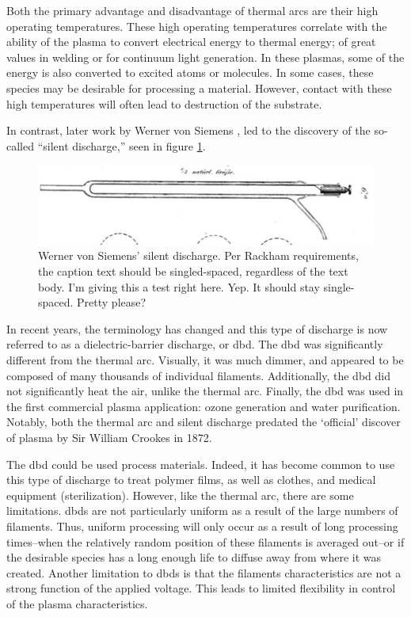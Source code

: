 Both the primary advantage and disadvantage of thermal arcs are their high
operating temperatures. These high operating temperatures correlate with the
ability of the plasma to convert electrical energy to thermal energy; of great
values in welding or for continuum light generation. In these plasmas, some of
the energy is also converted to excited atoms or molecules. In some cases, these
species may be desirable for processing a material. However, contact with these
high temperatures will often lead to destruction of the substrate.

In contrast, later work by Werner von Siemens \cite{Siemens1857}, led to the
discovery of the so-called ``silent discharge,'' seen in figure
\ref{fig:siemens}.
\begin{figure}\label{fig:siemens}
  \centering
  \includegraphics[scale=0.5]{chapters/introduction/figures/siemens.png}
  \caption{Werner von Siemens' silent discharge. Per Rackham requirements, the
caption text should be singled-spaced, regardless of the text body. I'm giving
this a test right here. Yep. It should stay single-spaced. Pretty please?}
\end{figure}
In recent years, the terminology has changed and this type of
discharge is now referred to as a dielectric-barrier discharge, or \acs{dbd}.
The \acs{dbd} was significantly different from the thermal arc. Visually, it was
much dimmer, and appeared to be composed of many thousands of individual
filaments. Additionally, the \acs{dbd} did not significantly heat the air,
unlike the thermal arc. Finally, the \acs{dbd} was used in the first commercial
plasma application: ozone generation and water purification. Notably, both the
thermal arc and silent discharge predated the `official' discover of plasma by
Sir William Crookes in 1872.

The \acs{dbd} could be used process materials. Indeed, it has become common to
use this type of discharge to treat polymer films, as well as clothes, and
medical equipment (sterilization). However, like the thermal arc, there are some
limitations. \acs{dbd}s are not particularly uniform as a result of the large
numbers of filaments. Thus, uniform processing will only occur as a result of
long processing times--when the relatively random position of these filaments is
averaged out--or if the desirable species has a long enough life to diffuse away
from where it was created. Another limitation to \acs{dbd}s is that the
filaments characteristics are not a strong function of the applied voltage. This
leads to limited flexibility in control of the plasma characteristics.


